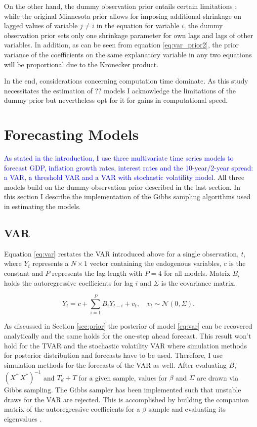 \documentclass[12pt,letterpaper,fleqn]{article}           %
\begin{document}
On the other hand, the dummy observation prior entails certain limitations \parencite{koop13}: while the original Minnesota prior allows for imposing additional shrinkage on lagged values of variable $j \neq i$ in the equation for variable $i$, the dummy observation prior sets only one shrinkage parameter for own lags and lags of other variables. In addition, as can be seen from equation \eqref{eq:var_prior2}, the prior variance of the coefficients on the same explanatory variable in any two equations will be proportional due to the Kronecker product.

In the end, considerations concerning computation time dominate. As this study necessitates the estimation of ?? models I acknowledge the limitations of the dummy prior but nevertheless opt for it for gains in computational speed.

\section{Forecasting Models}
\label{sec:models}    

\textcolor{blue}{As stated in the introduction, I use three multivariate time series models to forecast GDP, inflation growth rates, interest rates and the 10-year/2-year spread: a VAR, a threshold VAR and a VAR with stochastic volatility model.} All three models build on the dummy observation prior described in the last section. In this section I describe the implementation of the Gibbs sampling algorithms used in estimating the models.

\subsection{VAR}
\label{sec:VAR}

Equation \eqref{eq:var} restates the VAR introduced above for a single observation, $t$, where $Y_t$ represents a $N \times 1$ vector containing the endogenous variables, $c$ is the constant and $P$ represents the lag length with $P = 4$ for all models. Matrix $B_i$ holds the autoregressive coefficients for lag $i$ and $\Sigma$ is the covariance matrix. 

\begin{equation}
Y_t = c + \sum_{i=1}^P B_i Y_{t-i} + v_t, \quad v_t \sim \mathcal{N}(0,\Sigma). 
\label{eq:var}
\end{equation}

As discussed in Section \ref{sec:prior} the posterior of model \eqref{eq:var} can be recovered analytically and the same holds for the one-step ahead forecast. This result won't hold for the TVAR and the stochastic volatility VAR where simulation methods for posterior distribution and forecasts have to be used. Therefore, I use simulation methods for the forecasts of the VAR as well. After evaluating $\tilde{B}$, $(X^{*'}X^*)^{-1}$ and $T_d + T$ for a given sample, values for $\beta$ and $\Sigma$ are drawn via Gibbs sampling. The Gibbs sampler has been implemented such that unstable draws for the VAR are rejected. This is accomplished by building the companion matrix of the autoregressive coefficients for a $\beta$ sample and evaluating its eigenvalues \parencite[page 15f]{lpl05}.
\end{document}
